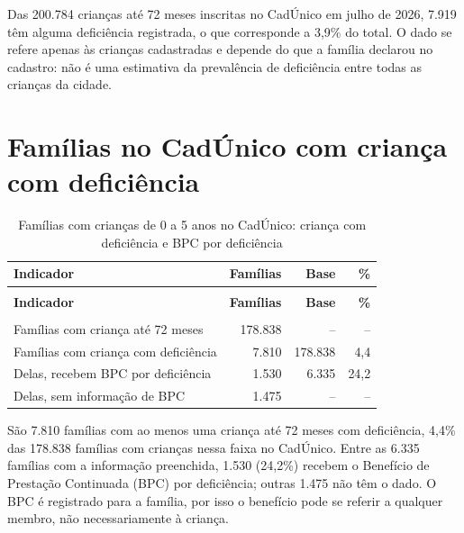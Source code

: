 Das 200.784 crianças até 72 meses inscritas no CadÚnico em julho de 2026, 7.919 têm alguma deficiência registrada, o que corresponde a 3,9\% do total. O dado se refere apenas às crianças cadastradas e depende do que a família declarou no cadastro: não é uma estimativa da prevalência de deficiência entre todas as crianças da cidade.


\section{Famílias no CadÚnico com criança com deficiência}

{\small\setlength{\tabcolsep}{5pt}
\begin{longtable}{@{}>{\raggedright\arraybackslash}p{3.6cm}rrr@{}}
\caption{Famílias com crianças de 0 a 5 anos no CadÚnico: criança com deficiência e BPC por deficiência}\label{tab:cadunico-deficiencia-familias-0-a-5-2026}\\
\toprule \textbf{Indicador} & \textbf{Famílias} & \textbf{Base} & \textbf{\%} \\ \midrule \endfirsthead
\multicolumn{4}{@{}l}{\footnotesize\itshape (continuação)}\\ \toprule \textbf{Indicador} & \textbf{Famílias} & \textbf{Base} & \textbf{\%} \\ \midrule \endhead
\midrule \multicolumn{4}{r@{}}{\footnotesize\itshape (continua)}\\ \endfoot
\bottomrule \endlastfoot
Famílias com criança até 72 meses & 178.838 & -- & -- \\
Famílias com criança com deficiência & 7.810 & 178.838 & 4,4 \\
Delas, recebem BPC por deficiência & 1.530 & 6.335 & 24,2 \\
Delas, sem informação de BPC & 1.475 & -- & -- \\
\end{longtable}}
\vspace{-6pt}


São 7.810 famílias com ao menos uma criança até 72 meses com deficiência, 4,4\% das 178.838 famílias com crianças nessa faixa no CadÚnico. Entre as 6.335 famílias com a informação preenchida, 1.530 (24,2\%) recebem o Benefício de Prestação Continuada (BPC) por deficiência; outras 1.475 não têm o dado. O BPC é registrado para a família, por isso o benefício pode se referir a qualquer membro, não necessariamente à criança.

